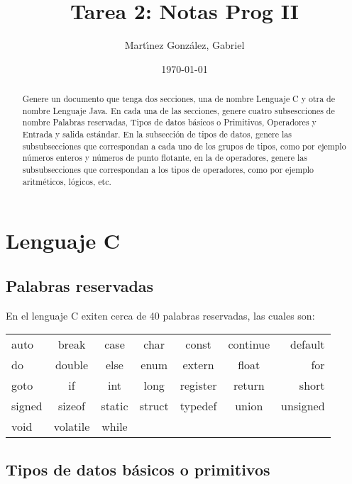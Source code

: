 \documentclass[12pt]{article}
\author{Mart\'{\i}nez Gonz\'alez, Gabriel}
\date{\today}
\title{Tarea 2: Notas Prog II}
\begin{document}
\maketitle

\begin{abstract}

	Genere un documento que tenga dos secciones, una de nombre Lenguaje C y otra de nombre Lenguaje Java. En cada una de las secciones, genere cuatro subsescciones de nombre Palabras reservadas, Tipos de datos b\'asicos o Primitivos, Operadores y Entrada y salida est\'andar. En la subsecci\'on de tipos de datos, genere las subsubsecciones que correspondan a cada uno de los grupos de tipos, como por ejemplo n\'umeros enteros y n\'umeros de punto flotante, en la de operadores, genere las subsubsecciones que correspondan a los tipos de operadores, como por ejemplo aritm\'eticos, l\'ogicos, etc.

\end{abstract}

\section{Lenguaje C}

\subsection{Palabras reservadas}

En el lenguaje C exiten cerca de 40 palabras reservadas, las cuales son:

\begin{center}
\begin{tabular}{lcccccr}

auto & {break} & case & char & const & continue & default \\
do & double & else & enum & extern & float & for \\
goto & if & int & long & register & return & short \\
signed & sizeof & static & struct & typedef & union & unsigned \\
void & volatile & while &  &  &  &  \\

\end{tabular}
\end{center}

\subsection{Tipos de datos b\'asicos o primitivos}
\end{document}
